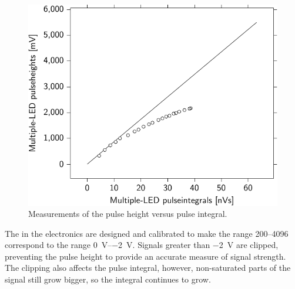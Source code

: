 \begin{figure}
    \centering
    \includegraphics{plots/calibration/linearity_senstech_ph_pi}
    \caption{Measurements of the pulse height versus pulse integral.}
    \label{fig:linearity_senstech_ph_pi}
\end{figure}

The \adcs in the \hisparc electronics are designed and calibrated to
make the range \SIrange{200}{4096}{\adc} correspond to the range
\SIrange{0}{-2}{\volt}. Signals greater than \SI{-2}{\volt} are clipped,
preventing the pulse height to provide an accurate measure of signal
strength. The clipping also affects the pulse integral, however,
non-saturated parts of the signal still grow bigger, so the integral
continues to grow.

